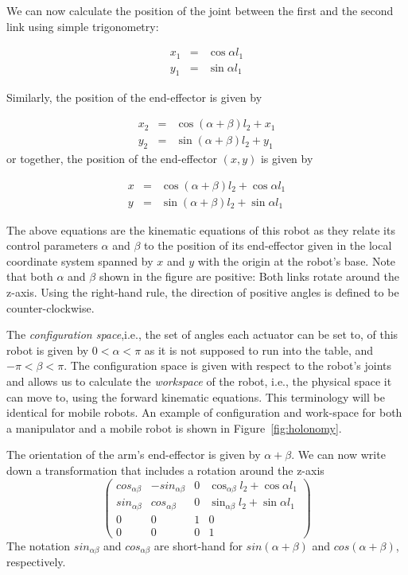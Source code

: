 We can now calculate the position of the joint between the first and the second link using simple trigonometry:

\begin{eqnarray}\label{eq:cosxl1}
x_1 &=&\cos \alpha l_1\\
y_1 &=&\sin \alpha l_1
\end{eqnarray}

Similarly, the position of the end-effector is given by

\begin{eqnarray}
x_2&=&\cos(\alpha+\beta)l_2+x_1\\
y_2&=&\sin(\alpha+\beta)l_2+y_1
\end{eqnarray}
%
or together, the position of the end-effector $(x,y)$ is given by

\begin{eqnarray}\label{eq:cosx}
x&=&\cos(\alpha+\beta)l_2+\cos\alpha l_1\\
y&=&\sin(\alpha+\beta)l_2+\sin\alpha l_1
\end{eqnarray}

The above equations are the kinematic equations of this robot as they relate its control parameters $ \alpha$ and $\beta$ to the position of its end-effector given in the local coordinate system spanned by $ x$ and $ y$ with the origin at the robot's base. Note that both $\alpha$ and $\beta$ shown in the figure are positive: Both links rotate around the z-axis. Using the right-hand rule, the direction of positive angles is defined to be counter-clockwise.

The \emph{configuration space},i.e., the set of angles each actuator can be set to, of this robot is given by $ 0 < \alpha < \pi $ as it is not supposed to run into the table, and $ -\pi < \beta < \pi$. The configuration space is given with respect to the robot's joints and allows us to calculate the \emph{workspace} of the robot, i.e., the physical space it can move to, using the forward kinematic equations. This terminology will be identical for mobile robots. An example of configuration and work-space for both a manipulator and a mobile robot is shown in Figure~\ref{fig:holonomy}.

The orientation of the arm's end-effector is given by $\alpha+\beta$. We can now write down  a transformation that includes a rotation around the z-axis
\begin{equation}
\label{eq:2armtrans}
\left(\begin{array}{llll}cos_{\alpha\beta} & -sin_{\alpha\beta} &  0 & \cos_{\alpha\beta}l_2+\cos\alpha l_1\\
                        sin_{\alpha\beta} & cos_{\alpha\beta} & 0 & \sin_{\alpha\beta}l_2+\sin\alpha l_1\\
                                                0 & 0 & 1 & 0\\
                                                0 & 0 & 0 & 1\end{array}\right)
\end{equation}
The notation $sin_{\alpha\beta}$ and $cos_{\alpha\beta}$ are short-hand for $sin(\alpha+\beta)$ and $cos(\alpha+\beta)$, respectively.

